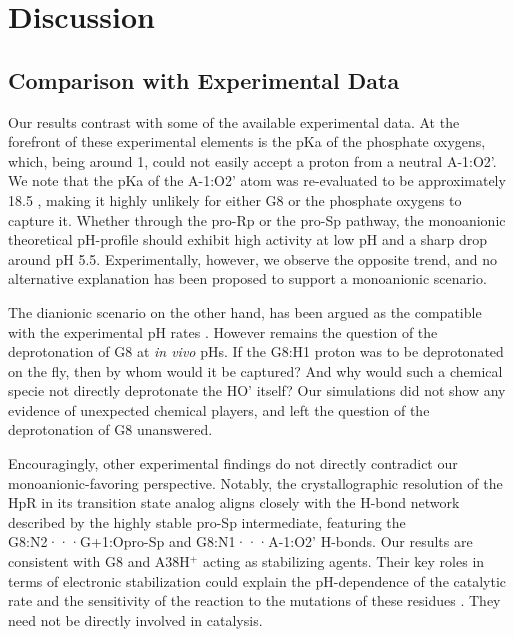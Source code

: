\documentclass[journal=jacsat,manuscript=article]{achemso}
\begin{document}
\section{Discussion}

\subsection{Comparison with Experimental Data}

Our results contrast with some of the available experimental data.
At the forefront of these experimental elements is the pKa of the phosphate oxygens,
which, being around 1, could not easily accept a proton from a neutral A-1:O2'.
We note that the pKa of the A-1:O2' atom was re-evaluated to be approximately 18.5 \cite{veenis_investigation_2021},
making it highly unlikely for either G8 or the phosphate oxygens to capture it.
Whether through the pro-Rp or the pro-Sp pathway, the monoanionic theoretical pH-profile
should exhibit high activity at low pH and a sharp drop around pH 5.5.
Experimentally, however, we observe the opposite trend,
and no alternative explanation has been proposed to support a monoanionic scenario.

The dianionic scenario on the other hand, has been argued 
as the compatible with the experimental pH rates \cite{kath-schorr_general_2012,wilson_hairpin_2011}. 
However remains the question of the deprotonation of G8 at \textit{in vivo} pHs. 
If the G8:H1 proton was to be deprotonated on the fly, then by whom would it be captured? 
And why would such a chemical specie not directly deprotonate the HO' itself? 
Our simulations did not show any evidence of unexpected chemical players, 
and left the question of the deprotonation of G8 unanswered.

Encouragingly, other experimental findings do not directly contradict our monoanionic-favoring perspective.
Notably, the crystallographic resolution of the HpR in its transition state analog \cite{torelli_comparison_2007}
aligns closely with the H-bond network described by the highly stable pro-Sp intermediate,
featuring the G8:N2···G+1:Opro-Sp and G8:N1···A-1:O2' H-bonds.
Our results are consistent with G8 and A38H$^+$ acting as stabilizing agents.
Their key roles in terms of electronic stabilization 
could explain the pH-dependence of the catalytic rate \cite{lebruska_rescue_2002, bevilacqua_mechanistic_2003, kuzmin_role_2004, nahas_observation_2004, wilson_nucleobase_2006, wilson_hairpin_2011} 
and the sensitivity of the reaction to the mutations of these residues \cite{mlynsky_extensive_2010, mlynsky_reactive_2015}. 
They need not be directly involved in catalysis.
\end{document}
